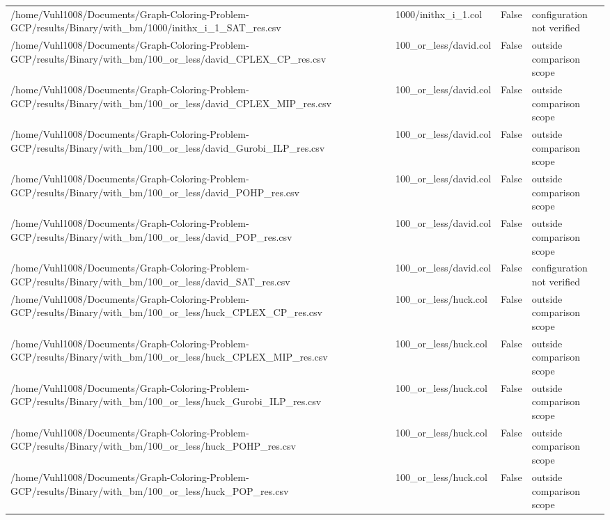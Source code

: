 \begin{table}[htbp]
\begin{tabular}{llll}
/home/Vuhl1008/Documents/Graph-Coloring-Problem-GCP/results/Binary/with\_bm/1000/inithx\_i\_1\_SAT\_res.csv & 1000/inithx\_i\_1.col & False & configuration not verified \\
/home/Vuhl1008/Documents/Graph-Coloring-Problem-GCP/results/Binary/with\_bm/100\_or\_less/david\_CPLEX\_CP\_res.csv & 100\_or\_less/david.col & False & outside comparison scope \\
/home/Vuhl1008/Documents/Graph-Coloring-Problem-GCP/results/Binary/with\_bm/100\_or\_less/david\_CPLEX\_MIP\_res.csv & 100\_or\_less/david.col & False & outside comparison scope \\
/home/Vuhl1008/Documents/Graph-Coloring-Problem-GCP/results/Binary/with\_bm/100\_or\_less/david\_Gurobi\_ILP\_res.csv & 100\_or\_less/david.col & False & outside comparison scope \\
/home/Vuhl1008/Documents/Graph-Coloring-Problem-GCP/results/Binary/with\_bm/100\_or\_less/david\_POHP\_res.csv & 100\_or\_less/david.col & False & outside comparison scope \\
/home/Vuhl1008/Documents/Graph-Coloring-Problem-GCP/results/Binary/with\_bm/100\_or\_less/david\_POP\_res.csv & 100\_or\_less/david.col & False & outside comparison scope \\
/home/Vuhl1008/Documents/Graph-Coloring-Problem-GCP/results/Binary/with\_bm/100\_or\_less/david\_SAT\_res.csv & 100\_or\_less/david.col & False & configuration not verified \\
/home/Vuhl1008/Documents/Graph-Coloring-Problem-GCP/results/Binary/with\_bm/100\_or\_less/huck\_CPLEX\_CP\_res.csv & 100\_or\_less/huck.col & False & outside comparison scope \\
/home/Vuhl1008/Documents/Graph-Coloring-Problem-GCP/results/Binary/with\_bm/100\_or\_less/huck\_CPLEX\_MIP\_res.csv & 100\_or\_less/huck.col & False & outside comparison scope \\
/home/Vuhl1008/Documents/Graph-Coloring-Problem-GCP/results/Binary/with\_bm/100\_or\_less/huck\_Gurobi\_ILP\_res.csv & 100\_or\_less/huck.col & False & outside comparison scope \\
/home/Vuhl1008/Documents/Graph-Coloring-Problem-GCP/results/Binary/with\_bm/100\_or\_less/huck\_POHP\_res.csv & 100\_or\_less/huck.col & False & outside comparison scope \\
/home/Vuhl1008/Documents/Graph-Coloring-Problem-GCP/results/Binary/with\_bm/100\_or\_less/huck\_POP\_res.csv & 100\_or\_less/huck.col & False & outside comparison scope \\

\end{tabular}
\end{table}
